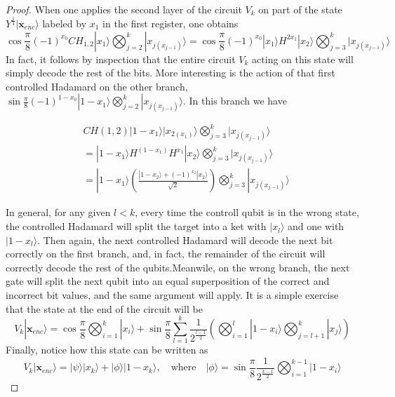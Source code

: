 \documentclass{article}
\theoremstyle{definition}
\newcommand{\ket}[1]{|#1\rangle}
\begin{document}
\begin{proof}
When one applies the second layer of the circuit $V_k$ on part of the state $Y^{\frac{1}{4}}\ket{\textbf{x}_{enc}}$ labeled by $x_1$ in the first register, one obtains 
\[\cos\frac{\pi}{8}(-1)^{x_0}CH_{1,2}\ket{x_1}\bigotimes_{j=2}^k\ket{x_{j(x_{j-1})}}=\cos\frac{\pi}{8}(-1)^{x_0}\ket{x_1}H^{2 x_1}\ket{x_2}\bigotimes_{j=3}^k\ket{x_{j(x_{j-1})}}\]
In fact, it follows by inspection that the entire circuit $V_k$ acting on this state will simply decode the rest of the bits. More interesting is the action of that first controlled Hadamard on the other branch, $\sin\frac{\pi}{8}(-1)^{1-x_0}\ket{1-x_1}\bigotimes_{j=2}^k\ket{x_{j(x_{j-1})}}$. In this branch we have

\begin{eqnarray}
&CH(1,2)\ket{1-x_1}\ket{x_{2(x_1)}}\bigotimes_{j=3}^k\ket{x_{j(x_{j-1})}}\\
&=\ket{1-x_1}H^{(1-x_1)}H^{x_1}\ket{x_2}\bigotimes_{j=3}^k\ket{x_{j(x_{j-1})}}\\
&=\ket{1-x_1}\left(\frac{\ket{1-x_2}+(-1)^{x_2}\ket{x_2}}{\sqrt2}\right)\bigotimes_{j=3}^k\ket{x_{j(x_{j-1})}}
\end{eqnarray}

In general, for any given $l<k$, every time the controll qubit is in the wrong state, the controlled Hadamard will split the target into a ket with $\ket{x_l}$ and one with $\ket{1-x_l}$. Then again, the next controlled Hadamard will decode the next bit correctly on the first branch, and, in fact, the remainder of the circuit will correctly decode the rest of the qubits.Meanwile, on the wrong branch, the next gate will split the next qubit into an equal superposition of the correct and incorrect bit values, and the same argument will apply. It is a simple exercise that the state at the end of the circuit will be
\begin{equation}
V_k\ket{\textbf{x}_{enc}}=\cos\frac{\pi}{8}\bigotimes_{i=1}^k\ket{x_i}+\sin\frac{\pi}{8}\sum_{l=1}^k\frac{1}{2^{\frac{l-1}{2}}}\left(\bigotimes_{i=1}^l\ket{1-x_i}\bigotimes_{j=l+1}^k\ket{x_j}\right)
\end{equation}
Finally, notice how this state can be written as
\[V_k\ket{\textbf{x}_{enc}}=\ket{\psi}\ket{x_k}+\ket{\phi}\ket{1-x_k},\quad \text{where} \quad \ket{\phi}=\sin\frac{\pi}{8}\frac{1}{2^{\frac{k-1}{2}}}\bigotimes_{i=1}^{k-1}\ket{1-x_i}\]

\end{proof}
\end{document}
